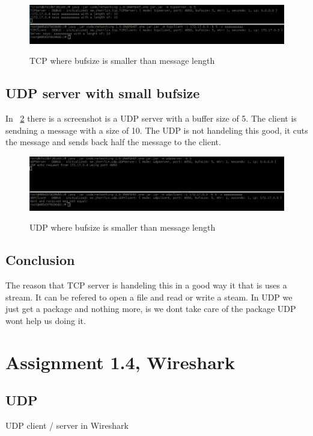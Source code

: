 \documentclass[a4paper,12pt]{article} %
\begin{document}
{\begin{figure}[H]
    \centering  
    \includegraphics[scale=0.33]{img/assignment13tcp.png}
	\label{fig:assignment13tcp}
	\caption{TCP where bufsize is smaller than message length}
\end{figure}

\subsection{UDP server with small bufsize}

In ~\ref{fig:assignment13udp} there is a screenshot is a UDP server with a buffer size of 5.
The client is sendning a message with a size of 10.
The UDP is not handeling this good, it cuts the message and sends back half the message to the client.

\begin{figure}[H]
    \centering  
    \includegraphics[scale=0.33]{img/assignment13udp.png}
	\label{fig:assignment13udp}
	\caption{UDP where bufsize is smaller than message length}
\end{figure}


\subsection{Conclusion}

The reason that TCP server is handeling this in a good way it that is uses a stream.
It can be refered to open a file and read or write a steam. 
In UDP we just get a package and nothing more, is we dont take care of the package 
UDP wont help us doing it.


\clearpage

\section{Assignment 1.4, Wireshark}

\subsection{UDP}
UDP client / server in Wireshark
}
\end{document}

